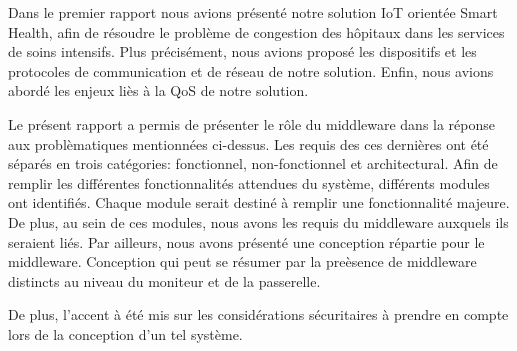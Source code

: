 Dans le premier rapport nous avions présenté notre solution IoT orientée Smart Health, afin de résoudre le problème de congestion des hôpitaux dans les
services de soins intensifs. Plus précisément, nous avions proposé les dispositifs et les protocoles de communication et de réseau
de notre solution. Enfin, nous avions abordé les enjeux liès à la QoS de notre solution.
\newline

Le présent rapport a permis de présenter le rôle du middleware dans la réponse aux problèmatiques mentionnées ci-dessus. Les
requis des ces dernières ont été séparés en trois catégories: fonctionnel, non-fonctionnel et architectural. Afin de remplir les
différentes fonctionnalités attendues du système, différents modules ont identifiés. Chaque module serait destiné à remplir une
fonctionnalité majeure. De plus, au sein de ces modules, nous avons les requis du middleware auxquels ils seraient liés.
Par ailleurs, nous avons présenté une conception répartie pour le middleware. Conception qui peut se résumer par la preèsence de
middleware distincts au niveau du moniteur et de la passerelle.
\newline

De plus, l'accent à été mis sur les considérations sécuritaires à prendre en compte lors de la conception d'un tel système.
